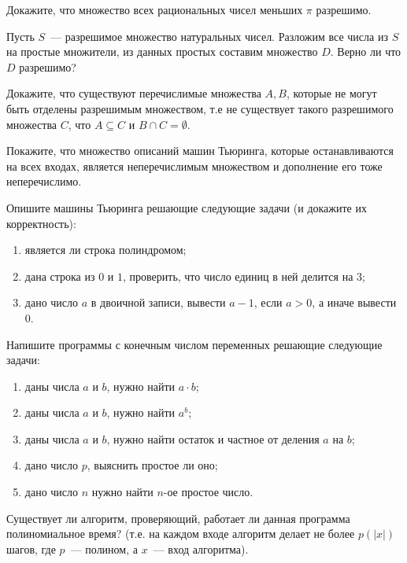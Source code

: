 \setcounter{curtask}{11}


\begin{task}
    Докажите, что множество всех рациональных чисел меньших $\pi$ разрешимо.
\end{task}

\begin{task}
    Пусть $S$~--- разрешимое множество натуральных чисел. Разложим все числа из $S$ на простые множители, из данных простых
    составим множество $D$. Верно ли что $D$ разрешимо?
\end{task}

\begin{task}
    Докажите, что существуют перечислимые множества $A, B$, которые не могут быть отделены разрешимым множеством, т.е не
	существует такого разрешимого множества $C$, что $A \subseteq C$ и $B \cap C = \emptyset$.
\end{task}


\begin{task}
    Покажите, что множество описаний машин Тьюринга, которые останавливаются на всех входах, является неперечислимым множеством и
    дополнение его тоже неперечислимо.
\end{task}


\begin{task}
	Опишите машины Тьюринга решающие следующие задачи (и докажите их корректность):
	\begin{enumerate}
		\item является ли строка полиндромом;
		\item дана строка из $0$ и $1$, проверить, что число единиц в ней делится на $3$;
		\item дано число $a$ в двоичной записи, вывести $a - 1$, если $a > 0$, а иначе вывести $0$.
	\end{enumerate}
\end{task}

\begin{task}
	Напишите программы с конечным числом переменных решающие следующие задачи:
	\begin{enumerate}
		\item даны числа $a$ и $b$, нужно найти $a \cdot b$;
		\item даны числа $a$ и $b$, нужно найти $a^b$;
		\item даны числа $a$ и $b$, нужно найти остаток и частное от деления $a$ на $b$;
		\item дано число $p$, выяснить простое ли оно;
		\item дано число $n$ нужно найти $n$-ое простое число.
	\end{enumerate}
\end{task}


\breakline

\begin{ptask}{9}
    Существует ли алгоритм, проверяющий, работает ли данная программа полиномиальное время? (т.е. на каждом входе алгоритм делает
    не более $p(|x|)$ шагов, где $p$~--- полином, а $x$~--- вход алгоритма).
\end{ptask}
